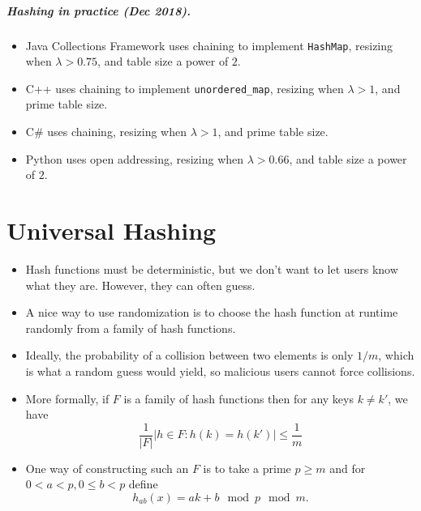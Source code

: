 \paragraph{Hashing in practice (Dec 2018).}
\begin{itemize}
\item Java Collections Framework uses chaining to implement \texttt{HashMap}, resizing when $\lambda > 0.75$, and table size a power of $2$.
\item C++  uses chaining to implement \texttt{unordered\_map}, resizing when $\lambda >1$, and prime table size.
\item C\# uses chaining, resizing when $\lambda >1$, and prime table size.
\item Python uses open addressing, resizing when $\lambda>0.66$, and table size a power of $2$.
\end{itemize}





\chapter{Universal Hashing} %

\begin{itemize}
\item Hash functions must be deterministic, but we don't want  to let users know what they are. 
However, they can often guess.
\item A nice way to use randomization is to choose the hash function at runtime randomly from a family of hash functions.
\item Ideally,   the probability of a collision between two elements is only $1/m$, which is what a random guess would yield, so malicious users cannot 
force collisions.
\item More formally, if $F$ is a family of hash functions then for any keys $k\neq k'$, we have
$$
\frac{1}{|F|} \left| h\in F : h(k) = h(k') \right| \leq \frac{1}{m}
$$
\item One way of constructing such an $F$ is to take a prime $p\geq m$  and for $0<a <p, 0\leq b < p$ define 
$$h_{ab}(x) = ak+b \mod p \mod m.$$
\end{itemize}

